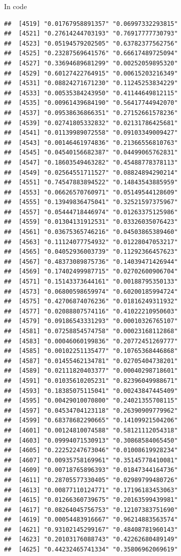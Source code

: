 \documentclass[ignorenonframetext,]{beamer}
\begin{document}
\begin{frame}[fragile]{In code}
\begin{verbatim}
##  [4519] "0.01767958891357" "0.06997332293815"
##  [4521] "0.27614244703193" "0.76917777730793"
##  [4523] "0.05194579202505" "0.63782377562756"
##  [4525] "0.23287569641576" "0.66617489725094"
##  [4527] "0.33694689681299" "0.00252059895320"
##  [4529] "0.60127422764915" "0.00615203216349"
##  [4531] "0.08824271671230" "0.11245253834229"
##  [4533] "0.00535384243950" "0.41144649812115"
##  [4535] "0.00961439684190" "0.56417744942070"
##  [4537] "0.09538636866351" "0.27152661578236"
##  [4539] "0.02741805332832" "0.02131786425681"
##  [4541] "0.01139989072558" "0.09103349009427"
##  [4543] "0.00146461974836" "0.21366556810763"
##  [4545] "0.04540156682387" "0.04499065762831"
##  [4547] "0.18603549463282" "0.45488778378113"
##  [4549] "0.02564551711527" "0.08824894290214"
##  [4551] "0.74547883894522" "0.14843543885959"
##  [4553] "0.06626570760971" "0.05149544128609"
##  [4555] "0.13949836475041" "0.32521597375967"
##  [4557] "0.05444718446974" "0.01263375125986"
##  [4559] "0.01304131912531" "0.03326035076423"
##  [4561] "0.03675365746216" "0.04503865389460"
##  [4563] "0.11124077754932" "0.01228047053217"
##  [4565] "0.04052936003739" "0.11292366457623"
##  [4567] "0.48373089875736" "0.14039471426944"
##  [4569] "0.17402499987715" "0.02702600906704"
##  [4571] "0.15143373644161" "0.00188795350133"
##  [4573] "0.06800598659974" "0.60200185994724"
##  [4575] "0.42706874076236" "0.01816249311932"
##  [4577] "0.02088807574116" "0.41022210950603"
##  [4579] "0.09186543331293" "0.00010326765107"
##  [4581] "0.07258854574758" "0.00023168112868"
##  [4583] "0.00046060199836" "0.20772451269777"
##  [4585] "0.00102251135477" "0.10765368446868"
##  [4587] "0.01455462134781" "0.02705404738201"
##  [4589] "0.02111820403377" "0.00040298718601"
##  [4591] "0.01035610205231" "0.82396049988671"
##  [4593] "0.18385075115041" "0.00243847445409"
##  [4595] "0.00429010070800" "0.24021355708115"
##  [4597] "0.04534704123118" "0.26390909779962"
##  [4599] "0.68378682290665" "0.14109921504206"
##  [4601] "0.00124810074588" "0.58121112054318"
##  [4603] "0.09994071530913" "0.30868584065450"
##  [4605] "0.22252247673046" "0.01008619928234"
##  [4607] "0.00935758169961" "0.35145778410081"
##  [4609] "0.00718765896393" "0.01847344164736"
##  [4611] "0.28705577330405" "0.02989799480726"
##  [4613] "0.00877110124771" "0.17196183453063"
##  [4615] "0.01266360739675" "0.20163599439981"
##  [4617] "0.08264045756753" "0.12107383751690"
##  [4619] "0.00054483916667" "0.96214883563574"
##  [4621] "0.93102145299167" "0.48408781960143"
##  [4623] "0.20103176088743" "0.42262680489149"
##  [4625] "0.44232465741334" "0.35806962069619"

\end{verbatim}
\end{frame}
\end{document}
